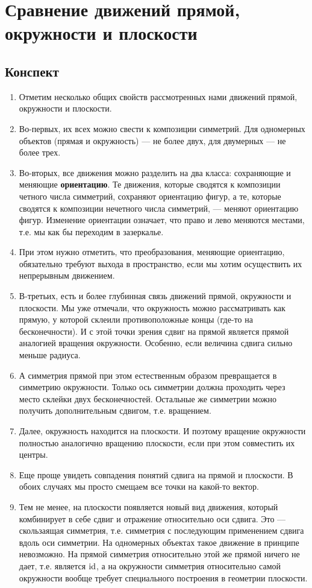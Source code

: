 \section{Сравнение движений прямой, окружности и плоскости}
\subsection*{Конспект}
\begin{enumerate}
\item Отметим несколько общих свойств рассмотренных нами движений прямой, окружности и плоскости.
\item Во-первых, их всех можно свести к композиции симметрий. Для одномерных объектов (прямая и окружность) --- не более двух, для двумерных --- не более трех.
\item Во-вторых, все движения можно разделить на два класса: сохраняющие и меняющие \textbf{ориентацию}. Те движения, которые сводятся к композиции четного числа симметрий, сохраняют ориентацию фигур, а те, которые сводятся к композиции нечетного числа симметрий, --- меняют ориентацию фигур. Изменение ориентации означает, что право и лево меняются местами, т.е. мы как бы переходим в зазеркалье. 
\item При этом нужно отметить, что преобразования, меняющие ориентацию, обязательно требуют выхода в пространство, если мы хотим осуществить их непрерывным движением.
\item В-третьих, есть и более глубинная связь движений прямой, окружности и плоскости. Мы уже отмечали, что окружность можно рассматривать как прямую, у которой склеили противоположные концы (где-то на бесконечности). И с этой точки зрения сдвиг на прямой является прямой аналогией вращения окружности. Особенно, если величина сдвига сильно меньше радиуса.
\item А симметрия прямой при этом естественным образом превращается в симметрию окружности. Только ось симметрии должна проходить через место склейки двух бесконечностей. Остальные же симметрии можно получить дополнительным сдвигом, т.е. вращением.
\item Далее, окружность находится на плоскости. И поэтому вращение окружности полностью аналогично вращению плоскости, если при этом совместить их центры.
\item Еще проще увидеть совпадения понятий сдвига на прямой и плоскости. В обоих случаях мы просто смещаем все точки на какой-то вектор.
\item Тем не менее, на плоскости появляется новый вид движения, который комбинирует в себе сдвиг и отражение относительно оси сдвига. Это --- скользаящая симметрия, т.е. симметрия с последующим применением сдвига вдоль оси симметрии. На одномерных объектах такое движение в принципе невозможно. На прямой симметрия относительно этой же прямой ничего не дает, т.е. является $\mathrm{id}$, а на окружности симметрия относительно самой окружности вообще требует специального построения в геометрии плоскости.
\end{enumerate}


